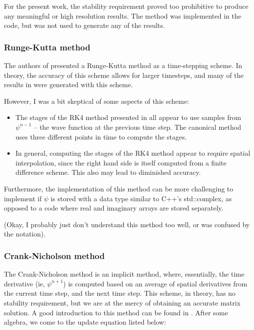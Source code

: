 \documentclass[letterpaper,12pt]{article}
\begin{document}
For the present work, the stability requirement proved too prohibitive to produce any meaningful or high resolution results. The method was implemented in the code, but was not used to generate any of the results.

\subsubsection{Runge-Kutta method}

The authors of \citep{reference} presented a Runge-Kutta method as a time-stepping scheme.  In theory, the accuracy of this scheme allows for larger timesteps, and many of the results in \citep{reference} were generated with this scheme.

However, I was a bit skeptical of some aspects of this scheme:

\begin{itemize}
  \item The stages of the RK4 method presented in \citep{reference} all appear to use samples from $\psi^{n-1}$ -- the wave function at the previous time step. The canonical method uses three different points in time to compute the stages. 
  \item In general, computing the stages of the RK4 method appear to require spatial interpolation, since the right hand side is itself computed from a finite difference scheme. This also may lead to diminished accuracy.
\end{itemize}

Furthermore, the implementation of this method can be more challenging to implement if $\psi$ is stored with a data type similar to C++'s std::complex, as opposed to a code where real and imaginary arrays are stored separately.

(Okay, I probably just don't understand this method too well, or was confused by the notation).


\subsubsection{Crank-Nicholson method}

The Crank-Nicholson method is an implicit method, where, essentially, the time derivative (ie, $\psi^{n+1}$) is computed based on an average of spatial derivatives from the current time step, and the next time step. This scheme, in theory, has no stability requirement, but we are at the mercy of obtaining an accurate matrix solution. A good introduction to this method can be found in \citep{heat}.  After some algebra, we come to the update equation listed below:
  
\end{document}
